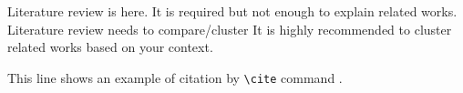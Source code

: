 ﻿Literature review is here.
It is required but not enough to explain related works.
Literature review needs to compare/cluster 
It is highly recommended to cluster related works based on your context.

This line shows an example of citation by \verb|\cite| command \cite{Ishikawa2009a}.
